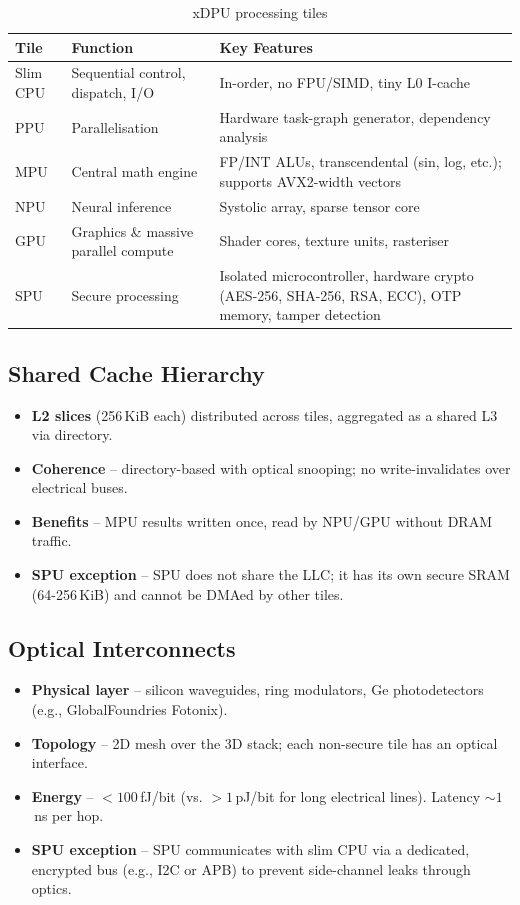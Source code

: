 \documentclass[10pt,twocolumn]{article}
\begin{document}
\begin{table}[ht]
\centering
\caption{xDPU processing tiles}
\label{tab:tiles}
\begin{tabular}{@{}lll@{}}
\toprule
\textbf{Tile} & \textbf{Function} & \textbf{Key Features} \\
\midrule
Slim CPU & Sequential control, dispatch, I/O & In-order, no FPU/SIMD, tiny L0 I-cache \\
PPU & Parallelisation & Hardware task-graph generator, dependency analysis \\
MPU & Central math engine & FP/INT ALUs, transcendental (sin, log, etc.); supports AVX2-width vectors \\
NPU & Neural inference & Systolic array, sparse tensor core \\
GPU & Graphics \& massive parallel compute & Shader cores, texture units, rasteriser \\
SPU & Secure processing & Isolated microcontroller, hardware crypto (AES-256, SHA-256, RSA, ECC), OTP memory, tamper detection \\
\bottomrule
\end{tabular}
\end{table}

\subsection{Shared Cache Hierarchy}
\begin{itemize}
\item \textbf{L2 slices} (256 KiB each) distributed across tiles, aggregated as a shared L3 via directory.
\item \textbf{Coherence} – directory-based with optical snooping; no write-invalidates over electrical buses.
\item \textbf{Benefits} – MPU results written once, read by NPU/GPU without DRAM traffic.
\item \textbf{SPU exception} – SPU does not share the LLC; it has its own secure SRAM (64-256 KiB) and cannot be DMAed by other tiles.
\end{itemize}

\subsection{Optical Interconnects}
\begin{itemize}
\item \textbf{Physical layer} – silicon waveguides, ring modulators, Ge photodetectors (e.g., GlobalFoundries Fotonix).
\item \textbf{Topology} – 2D mesh over the 3D stack; each non-secure tile has an optical interface.
\item \textbf{Energy} – \(<100\) fJ/bit (vs. \(>1\) pJ/bit for long electrical lines). Latency \(\sim1\) ns per hop.
\item \textbf{SPU exception} – SPU communicates with slim CPU via a dedicated, encrypted bus (e.g., I2C or APB) to prevent side-channel leaks through optics.
\end{itemize}
\end{document}
